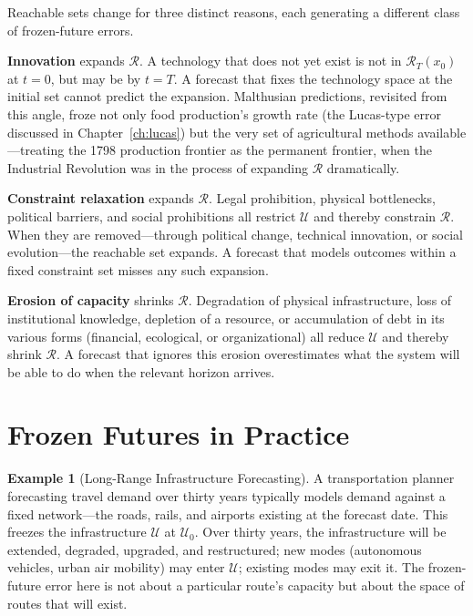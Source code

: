\documentclass[11pt]{book}
\theoremstyle{plain}
\theoremstyle{definition}
\newtheorem{example}[theorem]{Example}
\theoremstyle{remark}
\begin{document}
Reachable sets change for three distinct reasons, each generating a different class of frozen-future errors.

\textbf{Innovation} expands $\mathcal{R}$. A technology that does not yet exist is not in $\mathcal{R}_T(x_0)$ at $t=0$, but may be by $t = T$. A forecast that fixes the technology space at the initial set cannot predict the expansion. Malthusian predictions, revisited from this angle, froze not only food production's growth rate (the Lucas-type error discussed in Chapter~\ref{ch:lucas}) but the very set of agricultural methods available---treating the 1798 production frontier as the permanent frontier, when the Industrial Revolution was in the process of expanding $\mathcal{R}$ dramatically.

\textbf{Constraint relaxation} expands $\mathcal{R}$. Legal prohibition, physical bottlenecks, political barriers, and social prohibitions all restrict $\mathcal{U}$ and thereby constrain $\mathcal{R}$. When they are removed---through political change, technical innovation, or social evolution---the reachable set expands. A forecast that models outcomes within a fixed constraint set misses any such expansion.

\textbf{Erosion of capacity} shrinks $\mathcal{R}$. Degradation of physical infrastructure, loss of institutional knowledge, depletion of a resource, or accumulation of debt in its various forms (financial, ecological, or organizational) all reduce $\mathcal{U}$ and thereby shrink $\mathcal{R}$. A forecast that ignores this erosion overestimates what the system will be able to do when the relevant horizon arrives.

\section{Frozen Futures in Practice}

\begin{example}[Long-Range Infrastructure Forecasting]
A transportation planner forecasting travel demand over thirty years typically models demand against a fixed network---the roads, rails, and airports existing at the forecast date. This freezes the infrastructure $\mathcal{U}$ at $\mathcal{U}_0$. Over thirty years, the infrastructure will be extended, degraded, upgraded, and restructured; new modes (autonomous vehicles, urban air mobility) may enter $\mathcal{U}$; existing modes may exit it. The frozen-future error here is not about a particular route's capacity but about the space of routes that will exist.
\end{example}
\end{document}
